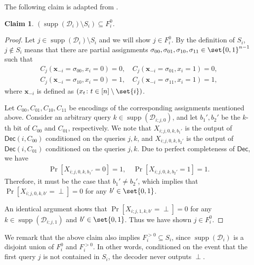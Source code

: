 \documentclass[10pt,a4paper]{article}
\newtheorem{claim}{Claim}
\theoremstyle{remark}
\newcommand{\tuple}[1]{\ensuremath{\left(#1\right)}}
\newcommand{\tp}{\tuple}
\def\*#1{\mathbf{#1}}
\def\+#1{\mathcal{#1}}
\newcommand{\Dec}{\ensuremath{\mathsf{Dec}}\xspace}
\providecommand{\supp}{\operatorname{supp}}
\begin{document}
The following claim is adapted from .
\begin{claim} \label{clm:adaptive-bot-fix}
	$(\supp(\+D_i) \setminus S_i) \subseteq F_i^{0}$. 
\end{claim}
\begin{proof}
	Let $j \in \supp(\+D_i) \setminus S_i$ and we will show $j \in F_i^{0}$. By the definition of $S_i$, $j \notin S_i$ means that there are partial assignments $\sigma_{00}, \sigma_{01}, \sigma_{10}, \sigma_{11} \in \set{0,1}^{n-1}$ such that 
	\begin{align*}
	C_j\tp{\*x_{-i} = \sigma_{00}, x_i = 0} = 0, \quad C_j\tp{\*x_{-i} = \sigma_{01}, x_i = 1} = 0, \\
	C_j\tp{\*x_{-i} = \sigma_{10}, x_i = 0} = 1, \quad C_j\tp{\*x_{-i} = \sigma_{11}, x_i = 1} = 1,
	\end{align*}
	where $\*x_{-i}$ is defined as $\tp{x_t \colon t \in [n]\setminus\set{i}}$.
	
	Let $C_{00}, C_{01}, C_{10}, C_{11}$ be encodings of the corresponding assignments mentioned above. Consider an arbitrary query $k \in \supp(\+D_{i;j,0})$, and let $b_1', b_2'$ be the $k$-th bit of $C_{00}$ and $C_{01}$, respectively. We note that $X_{i;j,0,k,b_1'}$ is the output of $\Dec(i,C_{00})$ conditioned on the queries $j, k$, and $X_{i;j,0,k,b_2'}$ is the output of $\Dec(i,C_{01})$ conditioned on the queries $j, k$. Due to perfect completeness of $\Dec$, we have
	\begin{align*}
	\Pr[X_{i;j,0,k,b_1'}=0] = 1, \quad \Pr[X_{i;j,0,k,b_2'}=1]=1.
	\end{align*}
	Therefore, it must be the case that $b_1' \neq b_2'$, which implies that $\Pr[X_{i;j,0,k,b'}=\perp]=0$ for any $b' \in \set{0,1}$.
	
	An identical argument shows that $\Pr[X_{i;j,1,k,b'}=\perp]=0$ for any $k \in \supp(\+D_{i;j,1})$ and $b' \in \set{0,1}$. Thus we have shown $j \in F_i^{0}$.
\end{proof}

We remark that the above claim also implies $F_i^{>0} \subseteq S_i$, since $\supp(\+D_i)$ is a disjoint union of $F_i^{0}$ and $F_i^{>0}$. In other words, conditioned on the event that the first query $j$ is not contained in $S_i$, the decoder never outputs $\perp$.
\end{document}
